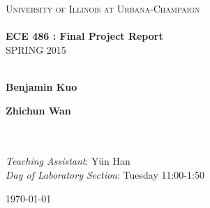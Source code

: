 \begin{titlepage}
	\begin{center}

		\textsc{\LARGE University of Illinois at Urbana-Champaign}\\[1.5cm]

		\HRule\\[0.4cm]
		{\huge \bfseries ECE 486 : Final Project Report \\[0.4cm] }
		\uppercase{Spring 2015}\\[0.5cm]

		\HRule\\[1.5cm]
                
		\noindent
		\begin{minipage}{0.4\textwidth}
			\begin{flushleft} \large
				\textbf{Benjamin Kuo} %
			\end{flushleft}
		\end{minipage}%
		\begin{minipage}{0.4\textwidth}
			\begin{flushright} \large
				\textbf{Zhichun Wan} %
			\end{flushright}
		\end{minipage}
		\\~\\
		\textit{Teaching Assistant}: Y\"{u}n Han\\ %
		\textit{Day of Laboratory Section}: Tuesday 11:00-1:50 %

		\vfill

		{\large \today} %

	\end{center}
\end{titlepage}








